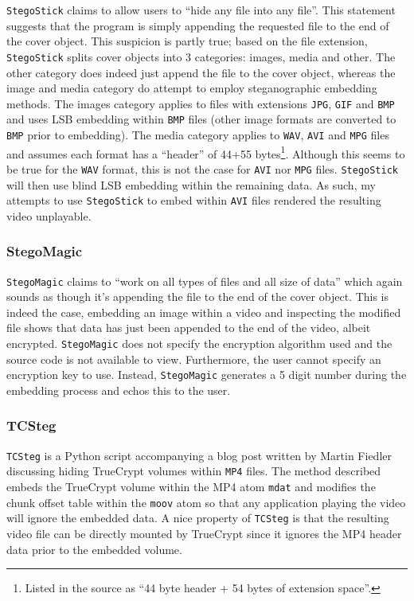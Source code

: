 \documentclass[paper=a4, fontsize=11pt,twoside]{scrartcl}    %
\begin{document}
\texttt{StegoStick} claims to allow users to ``hide any file into any file''. This statement suggests that the program is simply appending the requested file to the end of the cover object. This suspicion is partly true; based on the file extension, \texttt{StegoStick} splits cover objects into 3 categories: images, media and other. The other category does indeed just append the file to the cover object, whereas the image and media category do attempt to employ steganographic embedding methods. The images category applies to files with extensions \texttt{JPG}, \texttt{GIF} and \texttt{BMP} and uses LSB embedding within \texttt{BMP} files (other image formats are converted to \texttt{BMP} prior to embedding). The media category applies to \texttt{WAV}, \texttt{AVI} and \texttt{MPG} files and assumes each format has a ``header'' of 44+55 bytes\footnote{Listed in the source as ``44 byte header + 54 bytes of extension space''.}. Although this seems to be true for the \texttt{WAV} format, this is not the case for \texttt{AVI} nor \texttt{MPG} files. \texttt{StegoStick} will then use blind LSB embedding within the remaining data. As such, my attempts to use \texttt{StegoStick} to embed within \texttt{AVI} files rendered the resulting video unplayable. %

\subsubsection{StegoMagic}

\texttt{StegoMagic} claims to ``work on all types of files and all size of data'' which again sounds as though it's appending the file to the end of the cover object. This is indeed the case, embedding an image within a video and inspecting the modified file shows that data has just been appended to the end of the video, albeit encrypted. \texttt{StegoMagic} does not specify the encryption algorithm used and the source code is not available to view. Furthermore, the user cannot specify an encryption key to use. Instead, \texttt{StegoMagic} generates a 5 digit number during the embedding process and echos this to the user.  

\subsubsection{TCSteg}

\texttt{TCSteg} is a Python script accompanying a blog post written by Martin Fiedler discussing hiding TrueCrypt volumes within \texttt{MP4} files. The method described embeds the TrueCrypt volume within the MP4 atom \texttt{mdat} and modifies the chunk offset table within the \texttt{moov} atom so that any application playing the video will ignore the embedded data. A nice property of \texttt{TCSteg} is that the resulting video file can be directly mounted by TrueCrypt since it ignores the MP4 header data prior to the embedded volume.\\
\end{document}
